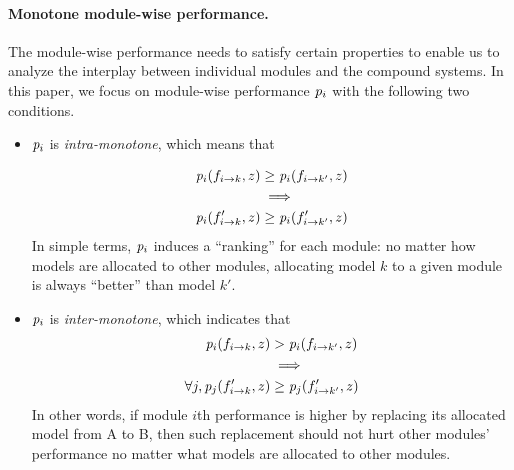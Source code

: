 \paragraph{Monotone module-wise performance.} The module-wise performance needs to satisfy certain properties to enable us to analyze the interplay between individual modules and the compound systems. In this paper, we focus on module-wise performance $\mathit{p}_i$ with the following two conditions. 
\begin{itemize}
    \item $\mathit{p}_i$ is \textit{intra-monotone}, which means that 
    
    \begin{equation*}
    \begin{split}
\mathit{p}_i(f_{i\rightarrow k},z) & \geq  \mathit{p}_i(f_{i\rightarrow k'},z) \\
&\implies\\\mathit{p}_i(f'_{i\rightarrow k},z) & \geq  \mathit{p}_i(f'_{i\rightarrow k'},z) 
    \end{split}
    \end{equation*}
In simple terms, $\mathit{p}_i$ induces a ``ranking'' for each module: no matter how models are allocated to other modules, allocating model $k$ to a given module is always ``better'' than model $k'$.  
    
    \item $\mathit{p}_i$ is \textit{inter-monotone}, which indicates that 
    \begin{equation*}
    \begin{split}
\mathit{p}_i(f_{i\rightarrow k},z) & >  \mathit{p}_i(f_{i\rightarrow k'},z)\\
&\implies\\\forall j, \mathit{p}_j(f'_{i\rightarrow k},z) & \geq  \mathit{p}_j(f'_{i\rightarrow k'},z) 
    \end{split}
    \end{equation*}
In other words,  if module $i$th performance is higher by replacing its allocated model from A to B, then such replacement should not hurt other modules' performance no matter what models are allocated to other modules. 
\end{itemize}

